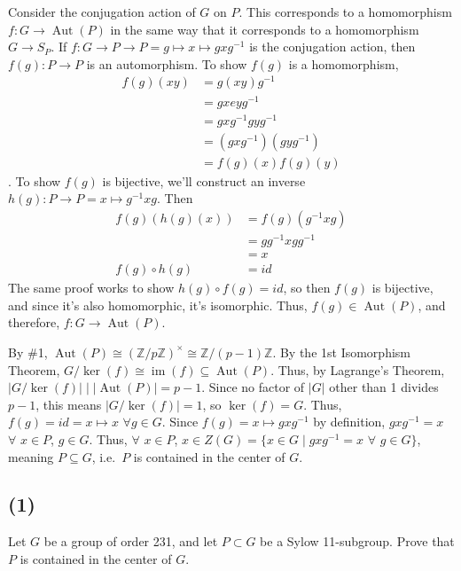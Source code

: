\documentclass[fleqn]{article}
\DeclareMathOperator{\im}{im}
\DeclareMathOperator{\Aut}{Aut}
\begin{document}
        Consider the conjugation action of $G$ on $P$.  This corresponds to a homomorphism $f: G \to \Aut(P)$ in the same way that it corresponds to a homomorphism $G \to S_P$.  If $f: G \to P \to P = g \mapsto x \mapsto gxg^{-1}$ is the conjugation action, then $f(g): P \to P$ is an automorphism.  To show $f(g)$ is a homomorphism, 
        \begin{align}
            f(g)(xy) 
                &= g(xy)g^{-1} \\
                &= gxeyg^{-1} \\
                &= gxg^{-1}gyg^{-1} \\
                &= (gxg^{-1})(gyg^{-1}) \\
                &= f(g)(x)f(g)(y)
        \end{align}.
        To show $f(g)$ is bijective, we'll construct an inverse $h(g): P \to P = x \mapsto g^{-1}xg$.  Then
        \begin{align}
            f(g)(h(g)(x)) 
                &= f(g)(g^{-1}xg) \\
                &= gg^{-1}xgg^{-1} \\
                &= x \\
            f(g) \circ h(g) &= id
        \end{align}
        The same proof works to show $h(g) \circ f(g) = id$, so then $f(g)$ is bijective, and since it's also homomorphic, it's isomorphic.  Thus, $f(g) \in \Aut(P)$, and therefore, $f: G \to \Aut(P)$.
        
        By \#1, $\Aut(P) \cong (\mathbb{Z}/p\mathbb{Z})^\times \cong \mathbb{Z}/(p - 1)\mathbb{Z}$.  By the 1st Isomorphism Theorem, $G/\ker(f) \cong \im(f) \subseteq \Aut(P)$.  Thus, by Lagrange's Theorem, $|G/\ker(f)| \mid |\Aut(P)| = p - 1$.  Since no factor of $|G|$ other than 1 divides $p - 1$, this means $|G/\ker(f)| = 1$, so $\ker(f) = G$.  Thus, $f(g) = id = x \mapsto x$ $\forall g \in G$.  Since $f(g) = x \mapsto gxg^{-1}$ by definition, $gxg^{-1} = x$ $\forall$ $x \in P$, $g \in G$.  Thus, $\forall$ $x \in P$, $x \in Z(G) = \{x \in G \mid gxg^{-1} = x$ $\forall$ $g \in G\}$, meaning $P \subseteq G$, i.e.\ $P$ is contained in the center of $G$.
        
        \subsection{(1)}
        Let $G$ be a group of order 231, and let $P \subset G$ be a Sylow 11-subgroup.  Prove that $P$ is contained in the center of $G$.
            
\end{document}
